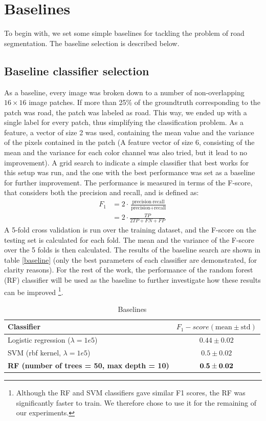 \documentclass[10pt,conference,compsocconf]{IEEEtran}
\begin{document}
	\section{Baselines}
	To begin with, we set some simple baselines for tackling the problem of road segmentation. The baseline selection is described below.
	\subsection{Baseline classifier selection}
	\label{baseline_selection}
	As a baseline, every image was broken down to a number of non-overlapping $16 \times 16$ image patches. If more than 25\% of the groundtruth corresponding to the patch was road, the patch was labeled as road. This way, we ended up with a single label for every patch, thus simplifying the classification problem. As a feature, a vector of size 2 was used, containing the mean value and the variance of the pixels contained in the patch (A feature vector of size 6, consisting of the mean and the variance for each color channel was also tried, but it lead to no improvement). A grid search to indicate a simple classifier that best works for this setup was run, and the one with the best performance was set as a baseline for further improvement.	
	The performance is measured in terms of the F-score, that considers both the precision and recall, and is defined as:
	\begin{align*}
	F_1 & = 2\cdot \frac{\text{precision}\cdot \text{recall}}{\text{precision} + \text{recall}} \\
	& = 2 \cdot \frac{TP}{2TP + FN + FP}
	\end{align*}
	A 5-fold cross validation is run over the training dataset, and the F-score on
  the testing set is calculated for each fold. The mean and the variance of the
  F-score over the 5 folds is then calculated. The results of the baseline
  search are shown in table \ref{baseline} (only the best parameters of each
  classifier are demonstrated, for clarity reasons). For the rest of the work,
  the performance of the random forest (RF) classifier will be used as the
  baseline to further investigate how these results can be improved
  \footnote{Although the RF and SVM classifiers gave similar F1 scores, the RF
    was significantly faster to train. We therefore chose to use it for the
    remaining of our experiments.}.
		\begin{table}[h]
		\caption{\label{baselines}Baselines}
		\centering
		\begin{tabular}{p{} c}		
			\textbf{Classifier} &  \textbf{$F_1-score (\text{mean}\pm \text{std})$}\\
			\hline \hline
			Logistic regression ($\lambda = 1e5$) & $0.44 \pm 0.02$ \\ \hline
			SVM (rbf kernel, $\lambda = 1e5$) & $0.5 \pm 0.02$ \\ \hline
			\textbf{RF (number of trees = 50, max depth = 10)} & $\bf{0.5 \pm 0.02}$ \\
			\hline
		\end{tabular}
		\end{table}
\end{document}
